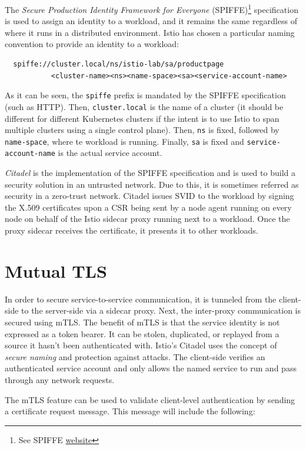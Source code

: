 The \textit{Secure Production Identity Framework for Everyone} (SPIFFE)\footnote{See SPIFFE \href{https://spiffe.io/}{website}} specification is used to assign an identity to a workload, and it remains the same regardless of where it runs in a distributed environment. Istio has chosen a particular naming convention to provide an identity to a workload:


\begin{lstlisting}
  spiffe://cluster.local/ns/istio-lab/sa/productpage
           <cluster-name><ns><name-space><sa><service-account-name>
\end{lstlisting}

\noindent As it can be seen, the \texttt{spiffe} prefix is mandated by the SPIFFE specification (such as HTTP). Then, \texttt{cluster.local} is the name of a cluster (it should be different for different Kubernetes clusters if the intent is to use Istio to span multiple clusters using a single control plane). Then, \texttt{ns} is fixed, followed by \texttt{name-space}, where te workload is running. Finally, \texttt{sa} is fixed and \texttt{service-account-name} is the actual service account.

\textit{Citadel} is the implementation of the SPIFFE specification and is used to build a security solution in an untrusted network. Due to this, it is sometimes referred as security in a zero-trust network. Citadel issues SVID to the workload by signing the X.509 certificates upon a CSR being sent by a node agent running on every node on behalf of the Istio sidecar proxy running next to a workload. Once the proxy sidecar receives the certificate, it presents it to other workloads.

\section{Mutual TLS}
In order to secure service-to-service communication, it is tunneled from the client-side to the server-side via a sidecar proxy. Next, the inter-proxy communication is secured using mTLS. The benefit of mTLS is that the service identity is not expressed as a token bearer. It can be stolen, duplicated, or replayed from a source it hasn't been authenticated with. Istio's Citadel uses the concept of \textit{secure naming} and protection against attacks. The client-side verifies an authenticated service account and only allows the named service to run and pass through any network requests.

The mTLS feature can be used to validate client-level authentication by sending a certificate request message. This message will include the following:

